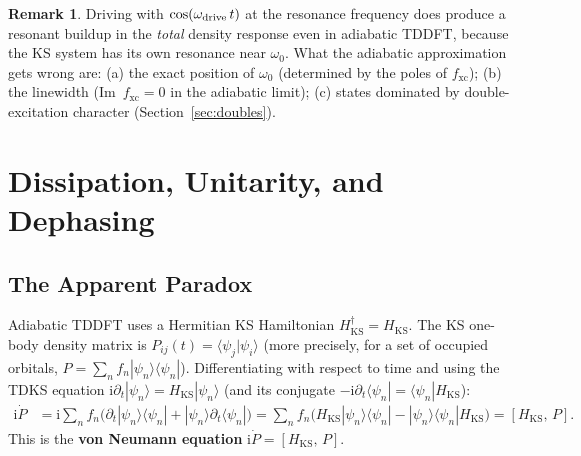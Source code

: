 \documentclass[12pt,letterpaper]{article}
\newcommand{\comm}[2]{\left[#1,\,#2\right]}
\newcommand{\ii}{\mathrm{i}}
\newcommand{\Hks}{H_{\mathrm{KS}}}
\newcommand{\fxc}{f_{\mathrm{xc}}}
\theoremstyle{definition}
\newtheorem{remark}{Remark}
\begin{document}
\begin{remark}
Driving with $\cos(\omega_{\rm drive}\,t)$ at the resonance frequency
does produce a resonant buildup in the \emph{total} density response
even in adiabatic TDDFT, because the KS system has its own resonance
near $\omega_0$.  What the adiabatic approximation gets wrong are:
(a) the exact position of $\omega_0$ (determined by the poles of
$\fxc$); (b) the linewidth (Im~$\fxc = 0$ in the adiabatic limit);
(c) states dominated by double-excitation character (Section~\ref{sec:doubles}).
\end{remark}

\section{Dissipation, Unitarity, and Dephasing}
\label{sec:dissipation}

\subsection{The Apparent Paradox}

Adiabatic TDDFT uses a Hermitian KS Hamiltonian $\Hks^\dagger = \Hks$.
The KS one-body density matrix is $P_{ij}(t) = \langle\psi_j|\psi_i\rangle$
(more precisely, for a set of occupied orbitals,
$P = \sum_n f_n |\psi_n\rangle\langle\psi_n|$).
Differentiating with respect to time and using the TDKS equation
$\ii\partial_t|\psi_n\rangle = \Hks|\psi_n\rangle$ (and its conjugate
$-\ii\partial_t\langle\psi_n| = \langle\psi_n|\Hks$):
\begin{align}
  \ii\dot{P}
  &= \ii\sum_n f_n\bigl(\partial_t|\psi_n\rangle\langle\psi_n|
                       + |\psi_n\rangle\partial_t\langle\psi_n|\bigr)
   = \sum_n f_n\bigl(\Hks|\psi_n\rangle\langle\psi_n|
                     - |\psi_n\rangle\langle\psi_n|\Hks\bigr)
   = \comm{\Hks}{P}.
  \label{eq:vonneumann_derive}
\end{align}
This is the \textbf{von Neumann equation} $\ii\dot{P} = \comm{\Hks}{P}$.
\end{document}
